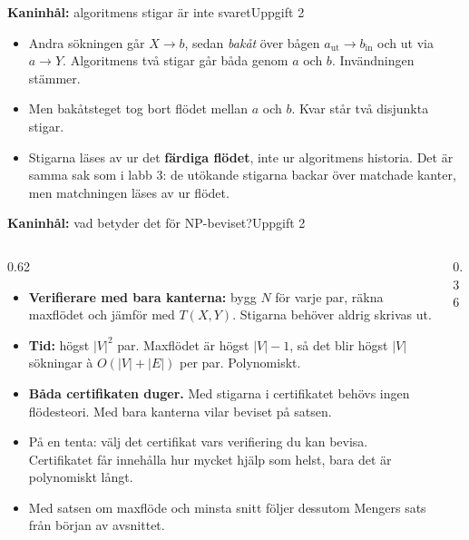 \documentclass[aspectratio=169,10pt]{beamer}
\newcommand{\rabbit}{\textcolor{warnorange}{\textbf{Kaninhål:}} }
\begin{document}
\begin{frame}{\rabbit algoritmens stigar är inte svaret}{Uppgift 2}
\begin{itemize}
    \item<2-> Andra sökningen går $X\to b$, sedan \emph{bakåt} över bågen $a_{\text{ut}}\to b_{\text{in}}$ och ut via $a\to Y$. Algoritmens två stigar går båda genom $a$ och $b$. Invändningen stämmer.
    \item<3-> Men bakåtsteget tog bort flödet mellan $a$ och $b$. Kvar står två disjunkta stigar.
    \item<4-> Stigarna läses av ur det \textbf{färdiga flödet}, inte ur algoritmens historia. Det är samma sak som i labb 3: de utökande stigarna backar över matchade kanter, men matchningen läses av ur flödet.
  \end{itemize}
\end{frame}

\begin{frame}{\rabbit vad betyder det för NP-beviset?}{Uppgift 2}
  \begin{columns}[T]
    \begin{column}{0.62\textwidth}
      \begin{itemize}
        \item<1-> \textbf{Verifierare med bara kanterna:} bygg $N$ för varje par, räkna maxflödet och jämför med $T(X,Y)$. Stigarna behöver aldrig skrivas ut.
        \item<2-> \textbf{Tid:} högst $|V|^2$ par. Maxflödet är högst $|V|-1$, så det blir högst $|V|$ sökningar à $O(|V|+|E|)$ per par. Polynomiskt.
        \item<3-> \textbf{Båda certifikaten duger.} Med stigarna i certifikatet behövs ingen flödesteori. Med bara kanterna vilar beviset på satsen.
        \item<4-> På en tenta: välj det certifikat vars verifiering du kan bevisa. Certifikatet får innehålla hur mycket hjälp som helst, bara det är polynomiskt långt.
        \item<5-> Med satsen om maxflöde och minsta snitt följer dessutom Mengers sats från början av avsnittet.
      \end{itemize}
    \end{column}
    \begin{column}{0.36\textwidth}
      \centering
    \end{column}
  \end{columns}
\end{frame}
\end{document}
